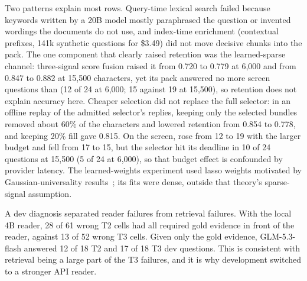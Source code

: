 Two patterns explain most rows. Query-time lexical search failed because keywords written by a 20B model mostly paraphrased the question or invented wordings the documents do not use, and index-time enrichment (contextual prefixes, 141k synthetic questions for \$3.49) did not move decisive chunks into the pack. The one component that clearly raised retention was the learned-sparse channel: three-signal score fusion raised it from 0.720 to 0.779 at 6,000 and from 0.847 to 0.882 at 15,500 characters, yet its pack answered no more screen questions than \hybrid{} (12 of 24 at 6,000; 15 against 19 at 15,500), so retention does not explain accuracy here. Cheaper selection did not replace the full selector: in an offline replay of the admitted selector's replies, keeping only the selected bundles removed about 60\% of the characters and lowered retention from 0.854 to 0.778, and keeping 20\% fill gave 0.815.
On the screen, \hybrid{} rose from 12 to 19 with the larger budget and \lexb{} fell from 17 to 15, but the selector hit its deadline in 10 of 24 questions at 15,500 (5 of 24 at 6,000), so that budget effect is confounded by provider latency. The learned-weights experiment used lasso weights motivated by Gaussian-universality results~\citep{mesforush2026lasso}; its fits were dense, outside that theory's sparse-signal assumption.

A dev diagnosis separated reader failures from retrieval failures. With the local 4B reader, 28 of 61 wrong T2 cells had all required gold evidence in front of the reader, against 13 of 52 wrong T3 cells. Given only the gold evidence, GLM-5.3-flash answered 12 of 18 T2 and 17 of 18 T3 dev questions. This is consistent with retrieval being a large part of the T3 failures, and it is why development switched to a stronger API reader.
